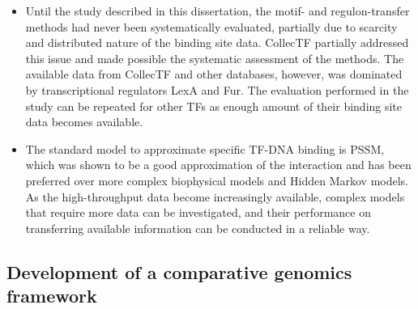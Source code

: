 \begin{itemize}

\item Until the study described in this dissertation, the motif- and
  regulon-transfer methods had never been systematically evaluated, partially
  due to scarcity and distributed nature of the binding site data. CollecTF
  partially addressed this issue and made possible the systematic assessment of
  the methods. The available data from CollecTF and other databases, however,
  was dominated by transcriptional regulators LexA and Fur. The evaluation
  performed in the study can be repeated for other TFs as enough amount of
  their binding site data becomes available.

\item The standard model to approximate specific TF-DNA binding is PSSM, which
  was shown to be a good approximation of the interaction and has been
  preferred over more complex biophysical models and Hidden Markov models. As
  the high-throughput data become increasingly available, complex models that
  require more data can be investigated, and their performance on transferring
  available information can be conducted in a reliable way.
\end{itemize}

\subsection{Development of a comparative genomics framework}

